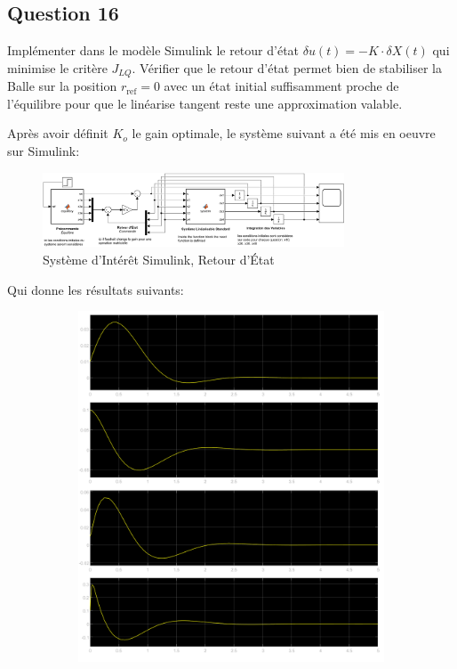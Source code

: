\documentclass[class=article, crop=false]{standalone}
\begin{document}
\subsection{Question 16}
\begin{exercise}
    Implémenter dans le modèle Simulink le retour d'état $\delta u(t) = - K \cdot \delta X(t)$ qui minimise le critère $J_{LQ}$. Vérifier que le retour d'état permet bien de stabiliser la Balle sur la position $r_{\text{ref}} = 0$ avec un état initial suffisamment proche de l'équilibre pour que le linéarise tangent reste une approximation valable.
\end{exercise}
\begin{resolution}
    Après avoir définit $K_{o}$ le gain optimale, le système suivant a été mis en oeuvre sur Simulink:
    \begin{figure}[H]
        \centering
        \includegraphics[width=0.8\textwidth]{../images/system_simulink_3.png}
        \caption{Système d'Intérêt Simulink, Retour d'État}
    \end{figure}
    Qui donne les résultats suivants:
    \begin{figure}[H]
        \centering
        \begin{subfigure}[b]{0.475\textwidth}
            \centering
            \includegraphics[width=\textwidth]{../images/simulink_scope3_0_01_1.png}

\end{subfigure}
\end{figure}
\end{resolution}
\end{document}
